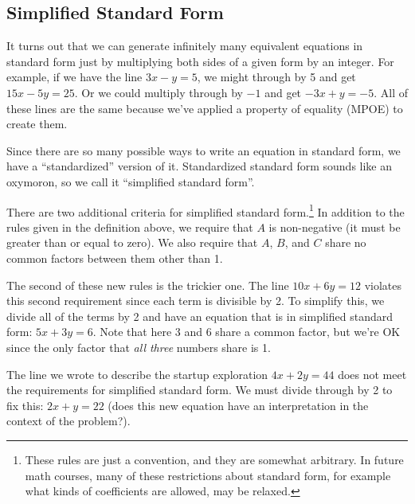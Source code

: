 \subsection{Simplified Standard Form}

It turns out that we can generate infinitely many equivalent equations in standard form just by multiplying both sides of a given form by an integer. For example, if we have the line $3x-y=5$, we might through by 5 and get $15x-5y=25$. Or we could multiply through by $-1$ and get $-3x+y=-5$. All of these lines are the same because we've applied a property of equality (MPOE) to create them.

Since there are so many possible ways to write an equation in standard form, we have a ``standardized'' version of it. Standardized standard form sounds like an oxymoron, so we call it ``simplified standard form''.

There are two additional criteria for simplified standard form.\footnote{These rules are just a convention, and they are somewhat arbitrary. In future math courses, many of these restrictions about standard form, for example what kinds of coefficients are allowed, may be relaxed.} In addition to the rules given in the definition above, we require that $A$ is non-negative (it must be greater than or equal to zero). We also require that $A$, $B$, and $C$ share no common factors between them other than 1. 

The second of these new rules is the trickier one. The line $10x + 6y = 12$ violates this second requirement since each term is divisible by 2. To simplify this, we divide all of the terms by 2 and have an equation that is in simplified standard form: $5x+3y=6$. Note that here 3 and 6 share a common factor, but we're OK since the only factor that \textit{all three} numbers share is 1.

The line we wrote to describe the startup exploration $4x+2y=44$ does not meet the requirements for simplified standard form. We must divide through by 2 to fix this: $2x+y=22$ (does this new equation have an interpretation in the context of the problem?).

